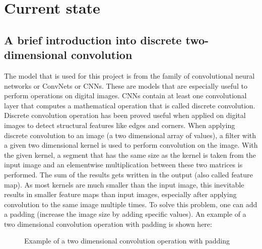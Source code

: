 \chapter{Current state}
\label{ch:currentState}

\section{A brief introduction into discrete two-dimensional convolution}

The model that is used for this project is from the family of convolutional neural networks or ConvNets or CNNs. These are models that are especially useful to perform operations on digital images. CNNs contain at least one convolutional layer that computes a mathematical operation that is called discrete convolution. Discrete convolution operation has been proved useful when applied on digital images to detect structural features like edges and corners. When applying discrete convolution to an image (a two dimensional array of values), a filter with a given two dimensional kernel is used to perform convolution on the image. With the given kernel, a segment that has the same size as the kernel is taken from the input image and an elementwise multiplication between these two matrices is performed. The sum of the results gets written in the output (also called feature map). As most kernels are much smaller than the input image, this inevitable results in smaller feature maps than input images, especially after applying convolution to the same image multiple times. To solve this problem, one can add a padding (increase the image size by adding specific values). An example of a two dimensional convolution operation with padding is shown here:

\begin{figure}[H]
	\caption{\label{fig:convolution} Example of a two dimensional convolution operation with padding}
\end{figure}

